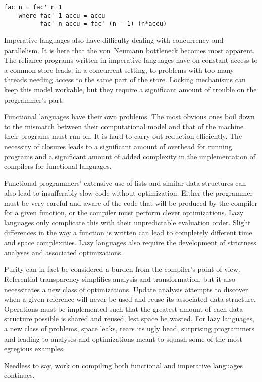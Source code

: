 \begin{lstlisting}[float,caption={A tail-recursive factorial function},label={tailrecursion}]
fac n = fac' n 1
    where fac' 1 accu = accu
          fac' n accu = fac' (n - 1) (n*accu)
\end{lstlisting}

Imperative languages also have difficulty dealing with concurrency and parallelism. It is here that the von~Neumann bottleneck becomes most apparent. The reliance programs written in imperative languages have on constant access to a common store leads, in a concurrent setting, to problems with too many threads needing access to the same part of the store. Locking mechanisms can keep this model workable, but they require a significant amount of trouble on the programmer's part.

Functional languages have their own problems. The most obvious ones boil down to the mismatch between their computational model and that of the machine their programs must run on. It is hard to carry out reduction efficiently. The necessity of closures leads to a significant amount of overhead for running programs and a significant amount of added complexity in the implementation of compilers for functional languages.

Functional programmers' extensive use of lists and similar data structures can also lead to insufferably slow code without optimization. Either the programmer must be very careful and aware of the code that will be produced by the compiler for a given function, or the compiler must perform clever optimizations. Lazy languages only complicate this with their unpredictable evaluation order. Slight differences in the way a function is written can lead to completely different time and space complexities. Lazy languages also require the development of strictness analyses and associated optimizations.

Purity can in fact be considered a burden from the compiler's point of view. Referential transparency simplifies analysis and transformation, but it also necessitates a new class of optimizations. Update analysis attempts to discover when a given reference will never be used and reuse its associated data structure. Operations must be implemented such that the greatest amount of each data structure possible is shared and reused, lest space be wasted. For lazy languages, a new class of problems, space leaks, rears its ugly head, surprising programmers and leading to  analyses and optimizations meant to squash some of the most egregious examples.

Needless to say, work on compiling both functional and imperative languages continues.